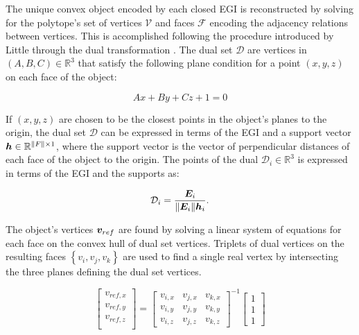 The unique convex object encoded by each closed EGI is reconstructed by solving for the polytope's set of vertices $\mathcal{V}$ and faces $\mathcal{F}$ encoding the adjacency relations between vertices. This is accomplished following the procedure introduced by Little through the dual transformation \cite{little1983}. The dual set $\mathcal{D}$ are vertices in $(A, B, C) \in \mathbb{R}^3$ that satisfy the following plane condition for a point $(x, y, z)$ on each face of the object:

\begin{equation} \label{eq:dual_abc_form}
  Ax + By + Cz + 1 = 0
\end{equation}

If $(x, y, z)$ are chosen to be the closest points in the object's planes to the origin, the dual set $\mathcal{D}$ can be expressed in terms of the EGI and a support vector $\bm{h} \in \mathbb{R}^{\|F\| \times 1}$, where the support vector is the vector of perpendicular distances of each face of the object to the origin. The points of the dual $\mathcal{D}_i \in \mathbb{R}^3$ is expressed in terms of the EGI and the supports as:

\begin{equation} \label{eq:dual_egi_form}
  \mathcal{D}_i = \frac{\bm{E}_i}{ \| \bm{E}_i \| \bm{h}_i}.
\end{equation}

The object's vertices $\bm{v}_{ref}$ are found by solving a linear system of equations for each face on the convex hull of dual set vertices. Triplets of dual vertices on the resulting faces $\left\{ v_i, v_j, v_k \right\}$ are used to find a single real vertex by intersecting the three planes defining the dual set vertices.

\begin{equation} \label{eq:vertex_recovery}
  \begin{bmatrix}
    v_{ref,x} \\
    v_{ref,y} \\
    v_{ref,z} \\
  \end{bmatrix} = \begin{bmatrix}
    v_{i,x} & v_{j,x} & v_{k,x} \\
    v_{i,y} & v_{j,y} & v_{k,y} \\
    v_{i,z} & v_{j,z} & v_{k,z}
  \end{bmatrix}^{-1} \begin{bmatrix}
    1 \\ 1 \\ 1
  \end{bmatrix}
\end{equation}

